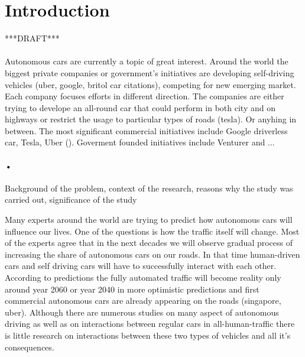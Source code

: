 \documentclass[11pt,english]{article}
\begin{document}

\tableofcontents %

\newpage %



\section{Introduction} %

***DRAFT***

\paragraph{}
Autonomous cars are currently a topic of great interest. Around the world the biggest private companies or government’s initiatives are developing self-driving vehicles (uber, google, britol car citations), competing for new emerging market. Each company focuses efforts in different direction. The companies are either trying to develope an all-round car that could perform in both city and on highways or restrict the usage to particular types of roads (tesla). Or anyhing in between. The most significant commercial initiatives include Google driverless car, Tesla, Uber (). Goverment founded initiatives include Venturer and ...

\paragraph{•}
Background of the problem, context of the research, reasons why the study was carried out, significance of the study



Many experts around the world are trying to predict how autonomous cars will influence our lives. One of the questions is how the traffic itself will change. Most of the experts agree that in the next decades we will observe gradual process of increasing the share of autonomous cars on our roads. In that time human-driven cars and self driving cars will have to successfully interact with each other. According to predictions the fully automated traffic will become reality only around year 2060 or year 2040 in more optimistic predictions and first commercial autonomous cars are already appearing on the roads (singapore, uber). Although there are numerous studies on many aspect of autonomous driving as well as on interactions between regular cars in all-human-traffic there is little research on interactions between these two types of vehicles and all it’s consequences.
\end{document}
